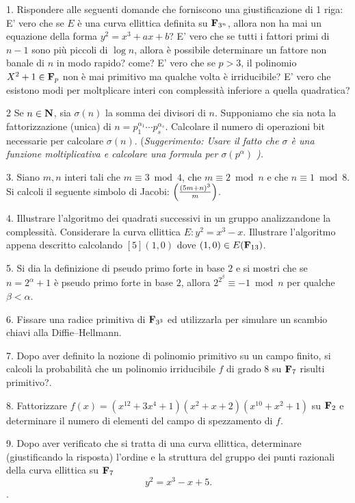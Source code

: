 \item{1.} Rispondere alle seguenti domande che forniscono una giustificazione di 1 riga:
 E' vero che se $E$ \`e una curva ellittica definita su ${\bf F}_{3^n}$, allora
non ha mai un equazione della forma $y^2=x^3+ax+b$?
 E' vero che se tutti i fattori primi di $n-1$ sono pi\`u piccoli di $\log n$, allora \`e
possibile determinare un fattore non banale di $n$ in modo rapido? come?
 E' vero che se $p>3$, il polinomio $X^2+1\in{\bf F}_p$ non \`e mai primitivo ma qualche volta \`e
irriducibile?
 E' vero che esistono modi per moltplicare interi con complessit\`a 
inferiore a quella quadratica?
\item{2} Se $n\in{\bf N}$, sia $\sigma(n)$ la somma dei divisori di $n$. Supponiamo che sia nota
la fattorizzazione (unica) di $n=p_1^{\alpha_1}\cdots p_s^{\alpha_s}$. Calcolare il
numero di operazioni bit necessarie per calcolare $\sigma(n)$. (\it Suggerimento: Usare il
fatto che $\sigma$ \`{e} una funzione moltiplicativa e calcolare una formula per $\sigma(p^\alpha)$ \rm).
\item{3.} Siano $m,n$ interi tali che $m\equiv3\bmod4$,
che $m\equiv2\bmod n$ e che $n\equiv1\bmod8$. Si calcoli il
seguente simbolo di Jacobi: $\left({(5m+n)^3 \over m}\right)$.
\item{4.}  Illustrare l'algoritmo dei quadrati successivi in un gruppo analizzandone la complessit\`{a}. Considerare
la curva ellittica $E: y^2=x^3-x.$ Illustrare l'algoritmo appena descritto calcolando $[5](1,0)$ dove $(1,0)\in E({\bf F}_{13})$.
\item{5.}  Si dia la definizione di pseudo primo forte in base $2$ e si mostri che
se $n=2^\alpha+1$ \`{e} pseudo primo forte in base $2$, allora
$2^{2^\beta}\equiv -1\bmod n$ per qualche $\beta<\alpha$.
\item{6.} Fissare una radice primitiva di ${\bf F}_{3^3}$ ed
 utilizzarla per simulare un scambio chiavi alla Diffie--Hellmann.
\item{7.} Dopo aver definito la nozione di polinomio primitivo su un campo finito, si calcoli la probabilit\`{a} che un polinomio
irriducibile $f$ di grado $8$ su ${\bf F}_{7}$ risulti primitivo?.
\item{8.}  Fattorizzare
$f(x)=(x^{12}+3x^{4}+1)(x^2+x+2)(x^{10}+x^2+1)$ su ${\bf
  F}_2$ e determinare il numero di elementi del campo di spezzamento di $f$.
\item{9.}  Dopo aver verificato che si tratta di una curva ellittica, determinare (giustificando la risposta)
l'ordine e la struttura del gruppo dei punti razionali della curva ellittica su
${\bf F}_7$
$$y^2=x^3-x+5.$$.
\bye